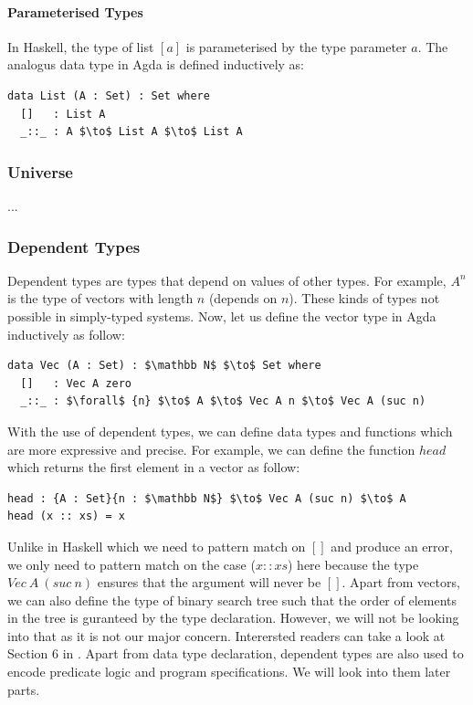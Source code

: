 \documentclass[twoside,openright,final]{bhamthesis}
\begin{document}
\paragraph{Parameterised Types} In Haskell, the type of list \([a]\) is parameterised by the type
parameter \(a\). The analogus data type in Agda is defined inductively as:
\begin{lstlisting}[mathescape=true,xleftmargin=.3\textwidth]
data List (A : Set) : Set where
  []   : List A
  _::_ : A $\to$ List A $\to$ List A
\end{lstlisting} 

\subsubsection{Universe}
\par ...

\subsubsection{Dependent Types}
\par Dependent types are types that depend on values of other
types. For example, \(A^n\) is the type of vectors with
length \(n\) (depends on \(n\)). These kinds of types not possible in
simply-typed systems. Now, let us define the vector type in Agda
inductively as follow:
\begin{lstlisting}[mathescape=true,xleftmargin=.3\textwidth]
data Vec (A : Set) : $\mathbb N$ $\to$ Set where
  []   : Vec A zero
  _::_ : $\forall$ {n} $\to$ A $\to$ Vec A n $\to$ Vec A (suc n)
\end{lstlisting} 
\par With the use of dependent types, we can define data types and
functions which are more expressive and precise. For example, we can
define the function \(head\) which returns the first element in a
vector as follow:
\begin{lstlisting}[mathescape=true,xleftmargin=.3\textwidth]
head : {A : Set}{n : $\mathbb N$} $\to$ Vec A (suc n) $\to$ A
head (x :: xs) = x 
\end{lstlisting} 
\par Unlike in Haskell which we need to pattern match on \([]\)
and produce an error, we only need to pattern match on the case (\(x :: xs\)) here
because the type \(Vec\ A\ (suc\ n)\) ensures that the argument will never
be \([]\). Apart from vectors, we can also define the type of binary
search tree such that the order of elements in the tree is guranteed by
the type declaration. However, we will not be looking into that as it
is not our major concern. Interersted readers can take a look at
Section 6 in \cite{bove2009}. Apart from data type declaration,
dependent types are also used to encode predicate logic and
program specifications. We will look into them later parts. 
\end{document}
